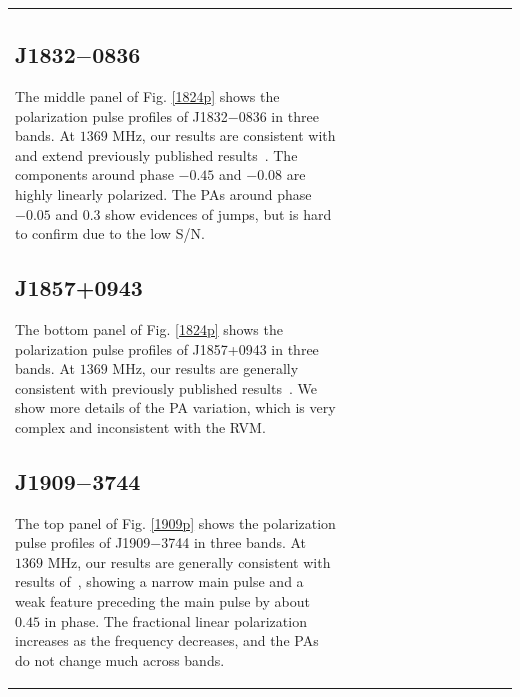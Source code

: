 \documentclass[useAMS,usenatbib]{mn2e}
\begin{document}
\begin{table}
\begin{center}
\begin{tabular}{lcccccccccccc}
\subsection{J1832$-$0836}

The middle panel of Fig. \ref{1824p} shows the polarization pulse profiles of 
J1832$-$0836 
in three bands.
%
At $1369$ MHz, our results are consistent with and extend previously published 
results~\citep{Burgay13}.
%
The components around phase $-0.45$ and $-0.08$ are highly linearly polarized. 
%
The PAs around phase $-0.05$ and $0.3$ show evidences of jumps, but is hard 
to confirm due to the low S/N.


\subsection{J1857+0943}

The bottom panel of Fig. \ref{1824p} shows the polarization pulse profiles of 
J1857+0943 
in three bands.
%
At $1369$ MHz, our results are generally consistent with previously published 
results~\citep{Yan11}.
%
We show more details of the PA variation, which is very complex and inconsistent 
with the RVM.
%


\subsection{J1909$-$3744}

The top panel of Fig. \ref{1909p} shows the polarization pulse profiles of 
J1909$-$3744 
in three bands.
%
At $1369$ MHz, our results are generally consistent with results of~\citet{Ord04,Yan11}, 
showing a narrow main pulse and a weak feature preceding the main pulse by about $0.45$ 
in phase.
%
The fractional linear polarization increases as the frequency decreases, and the
PAs do not change much across bands.



\end{tabular}
\end{center}
\end{table}
\end{document}
